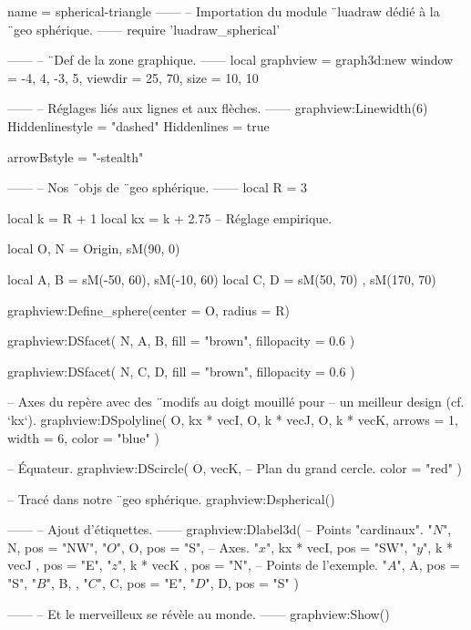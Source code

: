 \documentclass{standalone}
\begin{document}
\begin{luadraw}{name = spherical-triangle}
------
-- Importation du module ¨luadraw dédié à la ¨geo sphérique.
------
require 'luadraw_spherical'

------
-- ¨Def de la zone graphique.
------
local graphview = graph3d:new{
  window  = {-4, 4, -3, 5},
  viewdir = {25, 70},
  size    = {10, 10}
}

------
-- Réglages liés aux lignes et aux flèches.
------
graphview:Linewidth(6)
Hiddenlinestyle = "dashed"
Hiddenlines     = true

arrowBstyle = "-stealth"

------
-- Nos ¨objs de ¨geo sphérique.
------
local R =  3

local k  = R + 1
local kx = k + 2.75  -- Réglage empirique.

local O, N = Origin, sM(90, 0)

local A, B = sM(-50, 60), sM(-10, 60)
local C, D = sM(50, 70) , sM(170, 70)

graphview:Define_sphere({center = O, radius = R})

graphview:DSfacet(
  {N, A, B},
  {fill = "brown", fillopacity = 0.6}
)

graphview:DSfacet(
  {N, C, D},
  {fill = "brown", fillopacity = 0.6}
)

-- Axes du repère avec des ¨modifs au doigt mouillé pour
-- un meilleur design (cf. `kx`).
graphview:DSpolyline(
  {
    {O, kx * vecI},
    {O, k * vecJ},
    {O, k * vecK}},
    {arrows = 1, width = 6, color = "blue"}
)

-- Équateur.
graphview:DScircle(
  {O, vecK},       -- Plan du grand cercle.
  {color = "red"}
)

-- Tracé dans notre ¨geo sphérique.
graphview:Dspherical()

------
-- Ajout d'étiquettes.
------
graphview:Dlabel3d(
-- Points "cardinaux".
  "$N$", N, {pos = "NW"},
  "$O$", O, {pos = "S"},
-- Axes.
  "$x$", kx * vecI, {pos = "SW"},
  "$y$", k * vecJ , {pos = "E"},
  "$z$", k * vecK , {pos = "N"},
-- Points de l'exemple.
  "$A$", A, {pos = "S"},
  "$B$", B, {},
  "$C$", C, {pos = "E"},
  "$D$", D, {pos = "S"}
)

------
-- Et le merveilleux se révèle au monde.
------
graphview:Show()
\end{luadraw}
\end{document}
